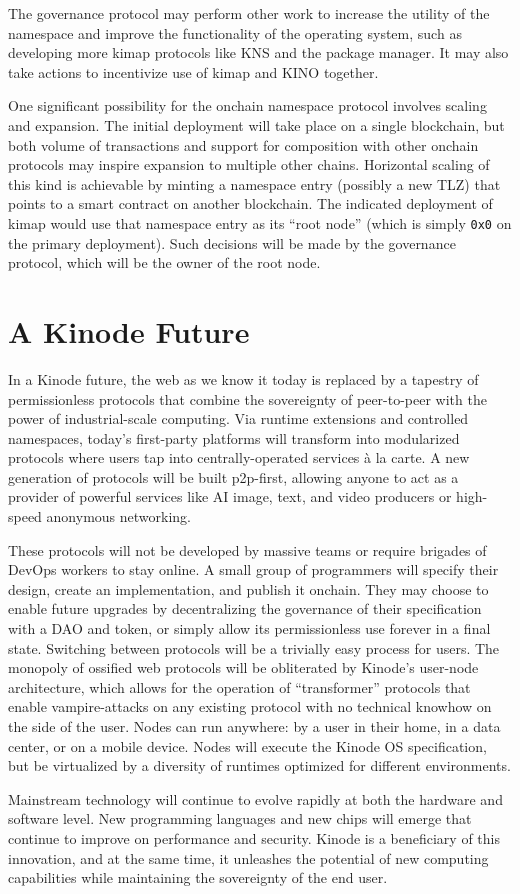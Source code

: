 \documentclass[runningheads]{llncs}
\begin{document}
The governance protocol may perform other work to increase the utility of the namespace and improve the functionality of the operating system, such as developing more kimap protocols like KNS and the package manager.
It may also take actions to incentivize use of kimap and KINO together.

One significant possibility for the onchain namespace protocol involves scaling and expansion.
The initial deployment will take place on a single blockchain, but both volume of transactions and support for composition with other onchain protocols may inspire expansion to multiple other chains.
Horizontal scaling of this kind is achievable by minting a namespace entry (possibly a new TLZ) that points to a smart contract on another blockchain.
The indicated deployment of kimap would use that namespace entry as its ``root node'' (which is simply \verb|0x0| on the primary deployment).
Such decisions will be made by the governance protocol, which will be the owner of the root node.

\clearpage

\section{A Kinode Future}
\label{sec:future}

In a Kinode future, the web as we know it today is replaced by a tapestry of permissionless protocols that combine the sovereignty of peer-to-peer with the power of industrial-scale computing.
Via runtime extensions and controlled namespaces, today's first-party platforms will transform into modularized protocols where users tap into centrally-operated services à la carte.
A new generation of protocols will be built p2p-first, allowing anyone to act as a provider of powerful services like AI image, text, and video producers or high-speed anonymous networking.

These protocols will not be developed by massive teams or require brigades of DevOps workers to stay online.
A small group of programmers will specify their design, create an implementation, and publish it onchain.
They may choose to enable future upgrades by decentralizing the governance of their specification with a DAO and token, or simply allow its permissionless use forever in a final state.
Switching between protocols will be a trivially easy process for users.
The monopoly of ossified web protocols will be obliterated by Kinode's user-node architecture, which allows for the operation of ``transformer'' protocols that enable vampire-attacks on any existing protocol with no technical knowhow on the side of the user.
Nodes can run anywhere: by a user in their home, in a data center, or on a mobile device.
Nodes will execute the Kinode OS specification, but be virtualized by a diversity of runtimes optimized for different environments.

Mainstream technology will continue to evolve rapidly at both the hardware and software level. New programming languages and new chips will emerge that continue to improve on performance and security.
Kinode is a beneficiary of this innovation, and at the same time, it unleashes the potential of new computing capabilities while maintaining the sovereignty of the end user.
\end{document}
